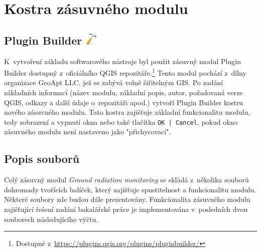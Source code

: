 \section{Kostra zásuvného modulu}
\subsection[Plugin Builder]{Plugin
Builder \includegraphics[scale=0.1]{./pictures/plugin_builder.png}}
K~vytvoření základu softwarového nástroje byl použit zásuvný modul
Plugin Builder dostupný z~oficiálního QGIS
repozitáře.\footnote{Dostupné
z~\url{https://plugins.qgis.org/plugins/pluginbuilder/}} Tento modul
pochází z~dílny organizace GeoApt LLC, jež se zabývá volně šiřitelným
GIS. Po zadání základních informací (název modulu, základní popis,
autor, požadovaná verze QGIS, odkazy a další údaje o~repozitáři apod.)
vytvoří Plugin Builder kostru nového zásuvného modulu. Tato kostra
zajišťuje základní funkcionalitu modulu, tedy zobrazení a vypnutí okna
nebo také tlačítka \texttt{OK | Cancel}, pokud okno zásuvného modulu
není nastaveno jako "přichycovací".

\subsection{Popis souborů} Celý zásuvný modul \textit{Ground radiation
monitoring} se skládá z~několika souborů dohromady tvořících balíček,
který zajišťuje spustitelnost a funkcionalitu modulu. Některé soubory
zde budou dále prezentovány. Funkcionalita zásuvného modulu
zajišťující řešení zadání bakalářské práce je implementována v~posledních
dvou souborech následujícího výčtu.


